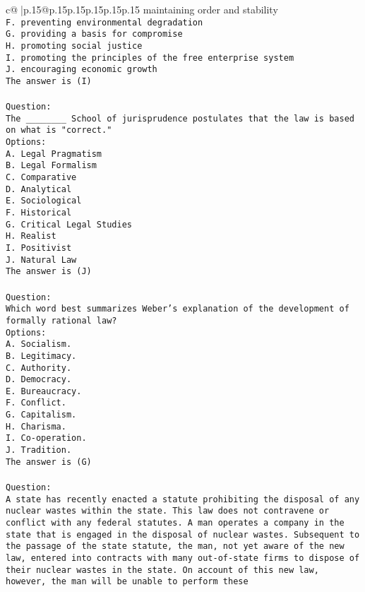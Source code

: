 \documentclass{article}
\begin{document}
{\begin{supertabular}{c@{$\;$}|p{.15\linewidth}@{}p{.15\linewidth}p{.15\linewidth}p{.15\linewidth}p{.15\linewidth}p{.15\linewidth}}
{{{maintaining order and stability\\ \tt F. preventing environmental degradation\\ \tt G. providing a basis for compromise\\ \tt H. promoting social justice\\ \tt I. promoting the principles of the free enterprise system\\ \tt J. encouraging economic growth\\ \tt The answer is (I)\\ \tt \\ \tt Question:\\ \tt The ________ School of jurisprudence postulates that the law is based on what is "correct."\\ \tt Options:\\ \tt A. Legal Pragmatism\\ \tt B. Legal Formalism\\ \tt C. Comparative\\ \tt D. Analytical\\ \tt E. Sociological\\ \tt F. Historical\\ \tt G. Critical Legal Studies\\ \tt H. Realist\\ \tt I. Positivist\\ \tt J. Natural Law\\ \tt The answer is (J)\\ \tt \\ \tt Question:\\ \tt Which word best summarizes Weber's explanation of the development of formally rational law?\\ \tt Options:\\ \tt A. Socialism.\\ \tt B. Legitimacy.\\ \tt C. Authority.\\ \tt D. Democracy.\\ \tt E. Bureaucracy.\\ \tt F. Conflict.\\ \tt G. Capitalism.\\ \tt H. Charisma.\\ \tt I. Co-operation.\\ \tt J. Tradition.\\ \tt The answer is (G)\\ \tt \\ \tt Question:\\ \tt A state has recently enacted a statute prohibiting the disposal of any nuclear wastes within the state. This law does not contravene or conflict with any federal statutes. A man operates a company in the state that is engaged in the disposal of nuclear wastes. Subsequent to the passage of the state statute, the man, not yet aware of the new law, entered into contracts with many out-of-state firms to dispose of their nuclear wastes in the state. On account of this new law, however, the man will be unable to perform these }}}
\end{supertabular}}
\end{document}

